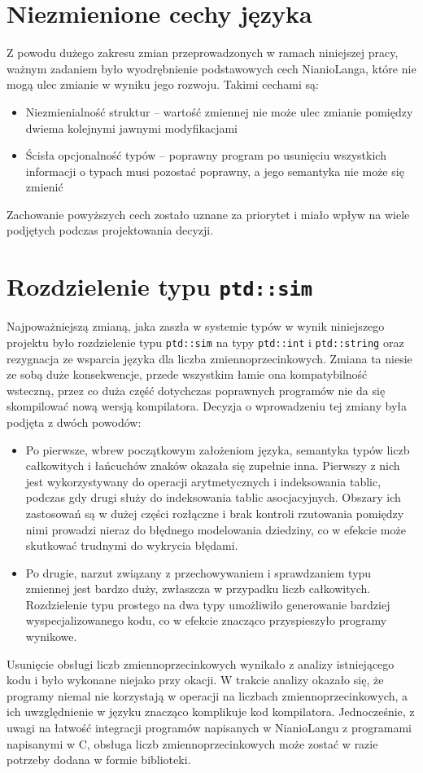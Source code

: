 \documentclass[licencjacka]{pracamgr}
\begin{document}
\section{Niezmienione cechy języka}
Z powodu dużego zakresu zmian przeprowadzonych w ramach niniejszej pracy, ważnym zadaniem było wyodrębnienie
podstawowych cech NianioLanga, które nie mogą ulec zmianie w wyniku jego rozwoju. Takimi cechami są:
\begin{itemize}
 \item Niezmienialność struktur -- wartość zmiennej nie może ulec zmianie pomiędzy dwiema kolejnymi jawnymi
 modyfikacjami
 \item Ścisła opcjonalność typów -- poprawny program po usunięciu wszystkich informacji o typach musi pozostać
 poprawny, a jego semantyka nie może się zmienić
\end{itemize}
Zachowanie powyższych cech zostało uznane za priorytet i miało wpływ na wiele podjętych podczas projektowania
decyzji.

\section{Rozdzielenie typu \texttt{ptd::sim}}
Najpoważniejszą zmianą, jaka zaszła w systemie typów w wynik niniejszego projektu było rozdzielenie
typu \texttt{ptd::sim} na typy \texttt{ptd::int} i \texttt{ptd::string} oraz rezygnacja ze wsparcia
języka dla liczba zmiennoprzecinkowych. Zmiana ta niesie ze sobą duże konsekwencje, przede wszystkim łamie
ona kompatybilność wsteczną, przez co duża część dotychczas poprawnych programów nie da się skompilować nową
wersją kompilatora. Decyzja o wprowadzeniu tej zmiany była podjęta z dwóch powodów:
\begin{itemize}
 \item Po pierwsze, wbrew początkowym założeniom języka, semantyka typów liczb całkowitych i łańcuchów znaków
 okazała się zupełnie inna. Pierwszy z nich jest wykorzystywany do operacji arytmetycznych i indeksowania tablic,
 podczas gdy drugi służy do indeksowania tablic asocjacyjnych. Obszary ich zastosowań są w dużej części rozłączne
 i brak kontroli rzutowania pomiędzy nimi prowadzi nieraz do błędnego modelowania dziedziny, co w efekcie
 może skutkować trudnymi do wykrycia błędami.
 \item Po drugie, narzut związany z przechowywaniem i sprawdzaniem typu zmiennej jest bardzo duży, zwłaszcza
 w przypadku liczb całkowitych. Rozdzielenie typu prostego na dwa typy umożliwiło generowanie bardziej
 wyspecjalizowanego kodu, co w efekcie znacząco przyspieszyło programy wynikowe.
\end{itemize}
Usunięcie obsługi liczb zmiennoprzecinkowych wynikało z analizy istniejącego kodu i było wykonane niejako
przy okacji. W trakcie analizy okazało się, że programy niemal nie korzystają w operacji na liczbach
zmiennoprzecinkowych, a ich uwzględnienie w języku znacząco komplikuje kod kompilatora. Jednocześnie,
z uwagi na łatwość integracji programów napisanych w NianioLangu z programami napisanymi w C, obsługa
liczb zmiennoprzecinkowych może zostać w razie potrzeby dodana w formie biblioteki.
\end{document}
